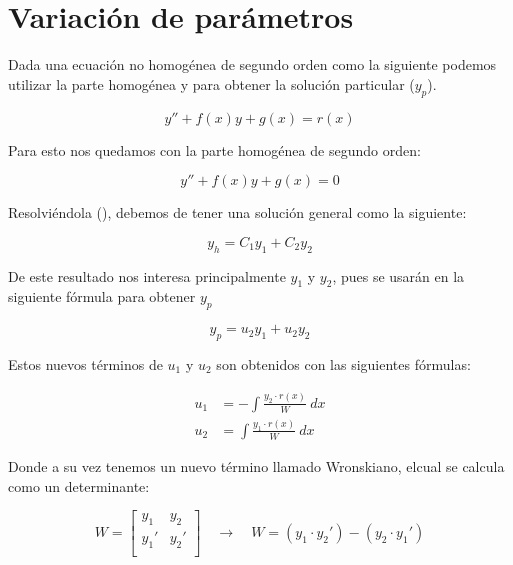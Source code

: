 \section{Variación de parámetros}\label{sec:variación_de_parámetros}

Dada una ecuación no homogénea de segundo orden como la siguiente podemos utilizar la parte homogénea y para obtener la solución particular ($y_{p}$).

\begin{equation*}
    y'' + f(x)y + g(x) = r(x)
\end{equation*}

Para esto nos quedamos con la parte homogénea de segundo orden:

\begin{equation*}
    y'' + f(x)y + g(x) = 0
\end{equation*}

Resolviéndola (), debemos de tener una solución general como la siguiente:

\begin{equation*}
    y_{h} = C_{1}y_{1} + C_{2}y_{2}
\end{equation*}

De este resultado nos interesa principalmente $y_{1}$ y $y_{2}$, pues se usarán en la siguiente fórmula para obtener $y_{p}$

\begin{equation*}
    y_{p} = u_{2}y_{1} + u_{2}y_{2}
\end{equation*}

Estos nuevos términos de $u_{1}$ y $u_{2}$ son obtenidos con las siguientes fórmulas:

\begin{align*}
    u_{1} &= -\int{\frac{y_{2} \cdot r(x)}{W} \ dx}
    \\
    u_{2} &= \int{\frac{y_{1} \cdot r(x)}{W} \ dx}
\end{align*}

Donde a su vez tenemos un nuevo término llamado Wronskiano, elcual se calcula como un determinante:

\begin{equation*}
    W= \begin{bmatrix} y_{1} & y_{2} \\ y_{1}' & y_{2}' \\ \end{bmatrix} \quad \longrightarrow \quad W = (y_{1} \cdot y_{2}')-(y_{2} \cdot y_{1}')
\end{equation*}
